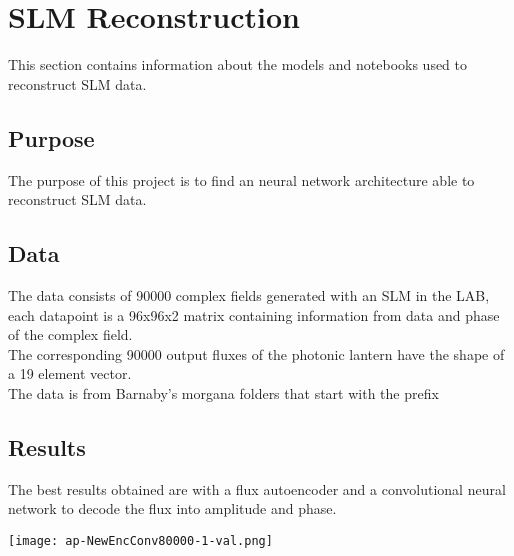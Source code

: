 \section{SLM Reconstruction}
    This section contains information about the models and notebooks used to reconstruct SLM data.
    
    \subsection{Purpose}
    		The purpose of this project is to find an neural network architecture able to reconstruct SLM data.
    		
    		
	\subsection{Data}
		The data consists of 90000 complex fields generated with an SLM in the LAB, each datapoint is a 96x96x2 matrix containing information from data and phase of the complex field.\\
		
		The corresponding 90000 output fluxes of the photonic lantern have the shape of a 19 element vector.\\
		
		The data is from Barnaby's morgana folders that start with the prefix \\ 
	
	\subsection{Results}
		The best results obtained are with a flux autoencoder and a convolutional neural network to decode the flux into amplitude and phase.
		
		\begin{figure*}[ht!]
			\centering
			\texttt{[image: ap-NewEncConv80000-1-val.png]}
		\end{figure*}
		\FloatBarrier
		
